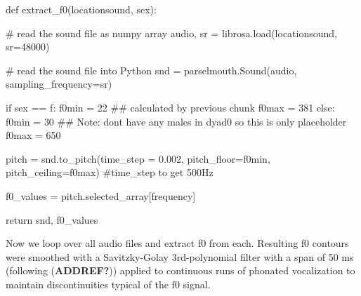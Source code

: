 \documentclass[
  letterpaper,
  DIV=11,
  numbers=noendperiod]{scrreprt}
\newenvironment{Shaded}{\begin{snugshade}}{\end{snugshade}}
\newcommand{\CommentTok}[1]{\textcolor[rgb]{0.37,0.37,0.37}{#1}}
\newcommand{\ControlFlowTok}[1]{\textcolor[rgb]{0.00,0.23,0.31}{#1}}
\newcommand{\DecValTok}[1]{\textcolor[rgb]{0.68,0.00,0.00}{#1}}
\newcommand{\FloatTok}[1]{\textcolor[rgb]{0.68,0.00,0.00}{#1}}
\newcommand{\KeywordTok}[1]{\textcolor[rgb]{0.00,0.23,0.31}{#1}}
\newcommand{\NormalTok}[1]{\textcolor[rgb]{0.00,0.23,0.31}{#1}}
\newcommand{\OperatorTok}[1]{\textcolor[rgb]{0.37,0.37,0.37}{#1}}
\newcommand{\StringTok}[1]{\textcolor[rgb]{0.13,0.47,0.30}{#1}}
\begin{document}
\begin{Shaded}
\begin{Highlighting}[]
\KeywordTok{def}\NormalTok{ extract\_f0(locationsound, sex):}

    \CommentTok{\# read the sound file as numpy array}
\NormalTok{    audio, sr }\OperatorTok{=}\NormalTok{ librosa.load(locationsound, sr}\OperatorTok{=}\DecValTok{48000}\NormalTok{)}

    \CommentTok{\# read the sound file into Python}
\NormalTok{    snd }\OperatorTok{=}\NormalTok{ parselmouth.Sound(audio, sampling\_frequency}\OperatorTok{=}\NormalTok{sr)}

    \ControlFlowTok{if}\NormalTok{ sex }\OperatorTok{==} \StringTok{\textquotesingle{}f\textquotesingle{}}\NormalTok{:}
\NormalTok{        f0min }\OperatorTok{=} \DecValTok{22}      \CommentTok{\#\# calculated by previous chunk}
\NormalTok{        f0max }\OperatorTok{=} \DecValTok{381}
    \ControlFlowTok{else}\NormalTok{:}
\NormalTok{        f0min }\OperatorTok{=} \DecValTok{30}      \CommentTok{\#\# Note: don\textquotesingle{}t have any males in dyad0 so this is only placeholder}
\NormalTok{        f0max }\OperatorTok{=} \DecValTok{650}

\NormalTok{    pitch }\OperatorTok{=}\NormalTok{ snd.to\_pitch(time\_step }\OperatorTok{=} \FloatTok{0.002}\NormalTok{, pitch\_floor}\OperatorTok{=}\NormalTok{f0min, pitch\_ceiling}\OperatorTok{=}\NormalTok{f0max) }\CommentTok{\#time\_step to get 500Hz}

\NormalTok{    f0\_values }\OperatorTok{=}\NormalTok{ pitch.selected\_array[}\StringTok{\textquotesingle{}frequency\textquotesingle{}}\NormalTok{]}

    \ControlFlowTok{return}\NormalTok{ snd, f0\_values}
\end{Highlighting}
\end{Shaded}

Now we loop over all audio files and extract f0 from each. Resulting f0
contours were smoothed with a Savitzky-Golay 3rd-polynomial filter with
a span of 50 ms (following (\textbf{ADDREF?})) applied to continuous
runs of phonated vocalization to maintain discontinuities typical of the
f0 signal.
\end{document}
